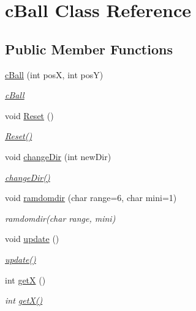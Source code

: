 \hypertarget{classc_ball}{}\section{c\+Ball Class Reference}
\label{classc_ball}
\subsection*{Public Member Functions}
\begin{DoxyCompactItemize}
\item 
\mbox{\hyperlink{classc_ball_a26865bcbfe3d50d5e938ec29eec791dd}{c\+Ball}} (int posX, int posY)
\begin{DoxyCompactList}\small\item\em \mbox{\hyperlink{classc_ball}{c\+Ball}} \end{DoxyCompactList}\item 
void \mbox{\hyperlink{classc_ball_a7c7b2cda898f6e1670faa2f753b9c420}{Reset}} ()
\begin{DoxyCompactList}\small\item\em \mbox{\hyperlink{classc_ball_a7c7b2cda898f6e1670faa2f753b9c420}{Reset()}} \end{DoxyCompactList}\item 
void \mbox{\hyperlink{classc_ball_a34a6133cf86c6a333ae9b14eef4d3f99}{change\+Dir}} (int new\+Dir)
\begin{DoxyCompactList}\small\item\em \mbox{\hyperlink{classc_ball_a34a6133cf86c6a333ae9b14eef4d3f99}{change\+Dir()}} \end{DoxyCompactList}\item 
void \mbox{\hyperlink{classc_ball_a026eb3b20f5ad8461d3f403a7343de33}{ramdomdir}} (char range=6, char mini=1)
\begin{DoxyCompactList}\small\item\em ramdomdir(char range, mini) \end{DoxyCompactList}\item 
void \mbox{\hyperlink{classc_ball_acbdd0fa42ab6efd934d4966f3bf2e411}{update}} ()
\begin{DoxyCompactList}\small\item\em \mbox{\hyperlink{classc_ball_acbdd0fa42ab6efd934d4966f3bf2e411}{update()}} \end{DoxyCompactList}\item 
int \mbox{\hyperlink{classc_ball_a6216240ba8780e2510c2d2eb5c792be0}{getX}} ()
\begin{DoxyCompactList}\small\item\em int \mbox{\hyperlink{classc_ball_a6216240ba8780e2510c2d2eb5c792be0}{get\+X()}} \end{DoxyCompactList}\item 

\end{DoxyCompactItemize}
